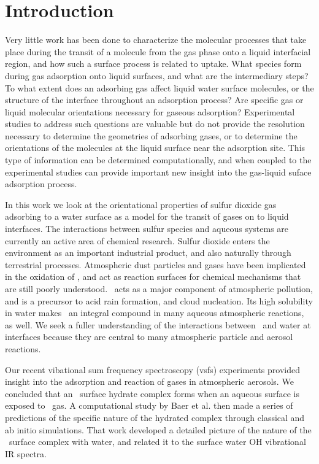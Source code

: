 \section{Introduction}

Very little work has been done to characterize the molecular processes that take place during the transit of a molecule from the gas phase onto a liquid interfacial region, and how such a surface process is related to uptake.  What species form during gas adsorption onto liquid surfaces, and what are the intermediary steps?  To what extent does an adsorbing gas affect liquid water surface molecules, or the structure of the interface throughout an adsorption process?  Are specific gas or liquid molecular orientations necessary for gaseous adsorption?  Experimental studies to address such questions are valuable but do not provide the resolution necessary to determine the geometries of adsorbing gases, or to determine the orientations of the molecules at the liquid surface near the adsorption site.
This type of information can be determined computationally, and when coupled to the experimental studies can provide important new insight into the gas-liquid suface adsorption process.

In this work we look at the orientational properties of sulfur dioxide gas adsorbing to a water surface as a model for the transit of gases on to liquid interfaces.  The interactions between sulfur species and aqueous systems are currently an active area of chemical research. Sulfur dioxide enters the environment as an important industrial product, and also naturally through terrestrial processes. Atmospheric dust particles and gases have been implicated in the oxidation of \suldiox, and act as reaction surfaces for chemical mechanisms that are still poorly understood.\cite{Baltrusaitis2011,Rubasinghege2010,Li2007} \suldiox~acts as a major component of atmospheric pollution, and is a precursor to acid rain formation, and cloud nucleation. Its high solubility in water makes \suldiox~an integral compound in many aqueous atmospheric reactions, as well. We seek a fuller understanding of the interactions between \suldiox~and water at interfaces because they are central to many atmospheric particle and aerosol reactions.

Our recent vibational sum frequency spectroscopy (vsfs) experiments provided insight into the adsorption and reaction of gases in atmospheric aerosols.\cite{Tarbuck2005,Tarbuck2006} We concluded that an \suldiox~surface hydrate complex forms when an aqueous surface is exposed to \suldiox~gas. A computational study by Baer et al.\cite{Baer2010} then made a series of predictions of the specific nature of the hydrated complex through classical and ab initio simulations. That work developed a detailed picture of the nature of the \suldiox~surface complex with water, and related it to the surface water OH vibrational IR spectra.

